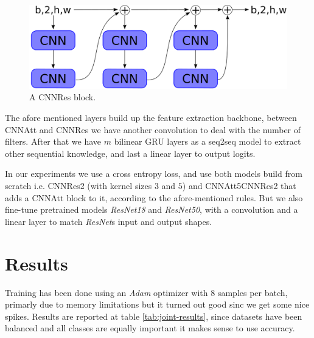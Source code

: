 \documentclass{article}
\begin{document}
\begin{figure}
    \centering
    \includegraphics[scale=.25]{images/cnn_res.png}
    \caption{A CNNRes block.}
    \label{fig:cnnres}
\end{figure}

The afore mentioned layers build up the feature extraction backbone, between CNNAtt and CNNRes we have another convolution to deal with the number of filters.
After that we have $m$ bilinear GRU layers as a seq2seq model to extract other sequential knowledge, and last a linear layer to output logits.

In our experiments we use a cross entropy loss, and use both models build  from scratch i.e. CNNRes2 (with kernel sizes $3$ and $5$) and CNNAtt5CNNRes2 that adds a CNNAtt block to it, according to the afore-mentioned rules.
But we also fine-tune pretrained models \textit{ResNet18} and \textit{ResNet50}, with a convolution and a linear layer to match \textit{ResNet}s input and output shapes.

\section{Results}
Training has been done using an \textit{Adam} optimizer with $8$ samples per batch, primarly due to memory limitations but it turned out good sinc we get some nice spikes.
Results are reported at table \ref{tab:joint-results}, since datasets have been balanced and all classes are equally important it makes sense to use accuracy.
\end{document}
